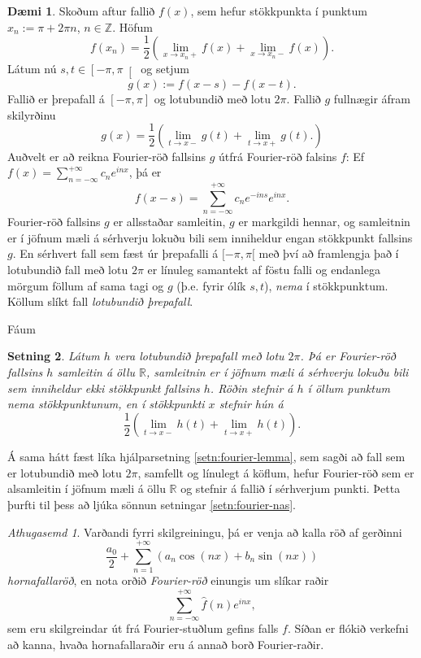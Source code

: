 \documentclass[a4paper,icelandic,11pt]{book}
\theoremstyle{plain}      \newtheorem{setn}{Setning}[chapter]
\theoremstyle{definition} \newtheorem{skilgr}[setn]{Skilgreining}
\newtheorem{daemi}[setn]{Dæmi}
\theoremstyle{remark}     \newtheorem*{ath}{Athugasemd}
\newcommand{\R}{\mathbb R}
\newcommand{\Z}{\mathbb Z}
\begin{document}
\begin{daemi}
  Skoðum aftur fallið $f(x)$, sem hefur stökkpunkta í punktum
  $x_{n}:=\pi+2\pi n$, $n\in\Z$. Höfum
  \[
  f(x_{n})
  = \frac 12\left(
    \lim_{x\to x_{n}+} f(x) + \lim_{x\to x_{n}-}f(x)
  \right).
  \]
  Látum nú $s,t\in\left[-\pi,\pi\right[$ og setjum
  \[
  g(x) := f(x-s) - f(x-t).
  \]
  Fallið er þrepafall á $[-\pi,\pi]$ og lotubundið með lotu
  $2\pi$. Fallið $g$ fullnægir áfram skilyrðinu
  \[
  g(x) = \frac 12 \left(
    \lim_{t\to x-}g(t) + \lim_{t\to x+} g(t).
  \right)
  \]
  Auðvelt er að reikna Fourier-röð fallsins $g$ útfrá Fourier-röð
  falsins $f$: Ef $f(x)=\sum_{n=-\infty}^{+\infty}c_{n}e^{inx}$, þá er
  \[
  f(x-s)
  = \sum_{n=-\infty}^{+\infty}c_{n}e^{-ins}e^{inx}.
  \]
  Fourier-röð fallsins $g$ er allsstaðar samleitin, $g$ er markgildi
  hennar, og samleitnin er í jöfnum mæli á sérhverju lokuðu bili sem
  inniheldur engan stökkpunkt fallsins $g$. En sérhvert fall sem fæst
  úr þrepafalli á $[-\pi,\pi[$ með því að framlengja það í lotubundið
  fall með lotu $2\pi$ er línuleg samantekt af föstu falli og
  endanlega mörgum föllum af sama tagi og $g$ (þ.e. fyrir ólík $s,t$),
  \emph{nema} í stökkpunktum. Köllum slíkt fall \emph{lotubundið
    þrepafall}.
\end{daemi}
Fáum
\begin{setn}
  Látum $h$ vera lotubundið þrepafall með lotu $2\pi$. Þá er
  Fourier-röð fallsins $h$ samleitin á öllu $\R$, samleitnin er í
  jöfnum mæli á sérhverju lokuðu bili sem inniheldur ekki stökkpunkt
  fallsins $h$. Röðin stefnir á $h$ í öllum punktum nema
  stökkpunktunum, en í stökkpunkti $x$ stefnir hún á
  \[
  \frac 12\left(
    \lim_{t\to x-} h(t)
    +
    \lim_{t\to x+} h(t)
  \right).
  \]
\end{setn}
Á sama hátt fæst líka hjálparsetning \ref{setn:fourier-lemma}, sem
sagði að fall sem er lotubundið með lotu $2\pi$, samfellt og línulegt
á köflum, hefur Fourier-röð sem er alsamleitin í jöfnum mæli á öllu
$\R$ og stefnir á fallið í sérhverjum punkti. Þetta þurfti til þess að
ljúka sönnun setningar \ref{setn:fourier-nas}.
\begin{ath}
  Varðandi fyrri skilgreiningu, þá er venja að kalla röð af gerðinni 
  \[
  \frac{a_{0}}{2} + \sum_{n=1}^{+\infty}(a_{n}\cos(nx)+b_{n}\sin(nx))
  \]
  \emph{hornafallaröð}, en nota
  orðið \emph{Fourier-röð} einungis um slíkar
  raðir
  \[
  \sum_{n=-\infty}^{+\infty}\hat f(n)e^{inx},
  \]
  sem eru skilgreindar út frá Fourier-stuðlum gefins falls $f$. Síðan
  er flókið verkefni að kanna, hvaða hornafallaraðir eru á annað borð
  Fourier-raðir.
\end{ath}
\end{document}
